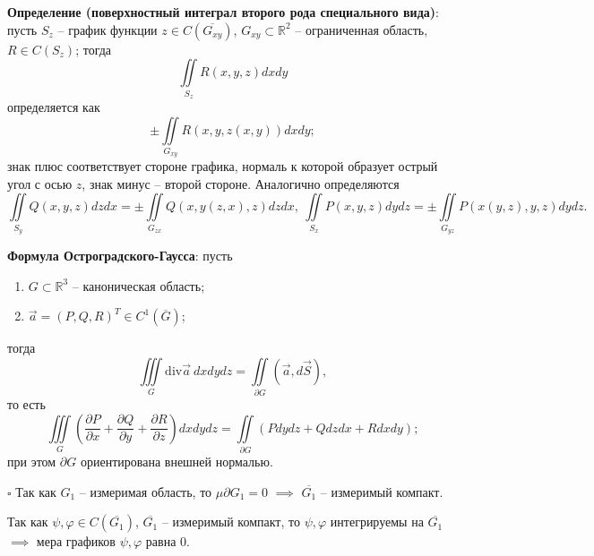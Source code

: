 \documentclass[12pt, a4paper, reqno]{article}
\begin{document}
    \textbf{Определение (поверхностный интеграл второго рода специального вида)}: пусть $S_z$ --
    график функции $z \in C(\overline{G_{xy}})$, $G_{xy} \subset \mathbb{R}^2$ -- ограниченная
    область, $R \in C(S_z)$; тогда
    \begin{equation*}
        \iint\limits_{S_z} R(x, y, z) dx dy
    \end{equation*}
    определяется как
    \begin{equation*}
        \pm \iint\limits_{G_{xy}} R(x, y, z(x, y)) dx dy;
    \end{equation*}
    знак плюс соответствует стороне графика, нормаль к которой образует острый угол с осью $z$,
    знак минус -- второй стороне. Аналогично определяются
    \begin{equation*}
        \iint\limits_{S_y} Q(x, y, z) dz dx = \pm \iint\limits_{G_{zx}} Q(x, y(z, x), z) dz dx,\
        \iint\limits_{S_x} P(x, y, z) dy dz = \pm \iint\limits_{G_{yz}} P(x(y, z), y, z) dy dz.
    \end{equation*}

    \textbf{Формула Остроградского-Гаусса}: пусть
    \begin{enumerate}
        \item $G \subset \mathbb{R}^3$ -- каноническая область;
        \item $\vec{a} = (P, Q, R)^T \in C^1(\overline{G})$;
    \end{enumerate}
    тогда
    \begin{equation*}
        \iiint\limits_{G}\text{div}\vec{a}\ dx dy dz = \iint\limits_{\partial G}(\vec{a}, d\vec{S}),
    \end{equation*}
    то есть
    \begin{equation*}
        \iiint\limits_{G}
        \left(
            \frac{\partial P}{\partial x} + \frac{\partial Q}{\partial y} + \frac{\partial R}{\partial z}
        \right)dx dy dz =
        \iint\limits_{\partial G}(P dy dz + Q dz dx + R dx dy);
    \end{equation*}
    при этом $\partial G$ ориентирована внешней нормалью.

    $\square$
    Так как $G_1$ -- измеримая область, то $\mu \partial G_1 = 0$ $\implies$ $\overline{G_1}$ --
    измеримый компакт.

    Так как $\psi, \varphi \in C(\overline{G_1})$, $\overline{G_1}$ -- измеримый компакт, то
    $\psi, \varphi$ интегрируемы на $\overline{G_1}$ $\implies$ мера графиков $\psi, \varphi$
    равна 0.
\end{document}
